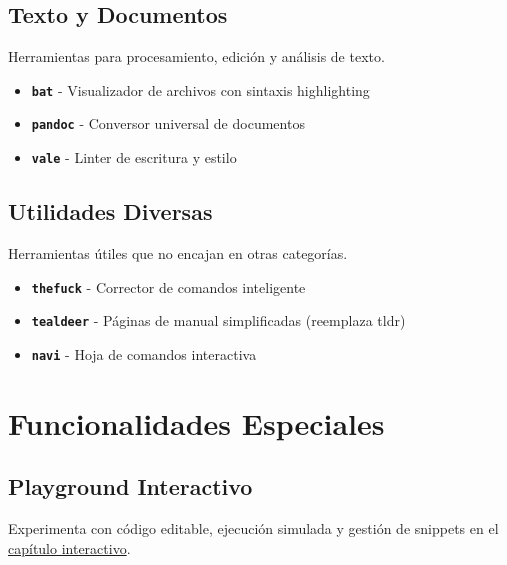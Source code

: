 \documentclass[
  11pt,
  letterpaper,
  oneside,
  openany]{scrbook}
\providecommand{\tightlist}{%
  \setlength{\itemsep}{0pt}\setlength{\parskip}{0pt}}
\begin{document}
\subsection*{Texto y Documentos}\label{texto-y-documentos}

Herramientas para procesamiento, edición y análisis de texto.

\begin{itemize}
\tightlist
\item
  \textbf{\texttt{bat}} - Visualizador de archivos con sintaxis
  highlighting
\item
  \textbf{\texttt{pandoc}} - Conversor universal de documentos
\item
  \textbf{\texttt{vale}} - Linter de escritura y estilo
\end{itemize}

\subsection*{Utilidades Diversas}\label{utilidades-diversas}

Herramientas útiles que no encajan en otras categorías.

\begin{itemize}
\tightlist
\item
  \textbf{\texttt{thefuck}} - Corrector de comandos inteligente
\item
  \textbf{\texttt{tealdeer}} - Páginas de manual simplificadas
  (reemplaza tldr)
\item
  \textbf{\texttt{navi}} - Hoja de comandos interactiva
\end{itemize}

\section*{Funcionalidades Especiales}\label{funcionalidades-especiales}


\subsection*{Playground Interactivo}\label{playground-interactivo}

Experimenta con código editable, ejecución simulada y gestión de
snippets en el \href{interactive-playground.qmd}{capítulo interactivo}.
\end{document}
